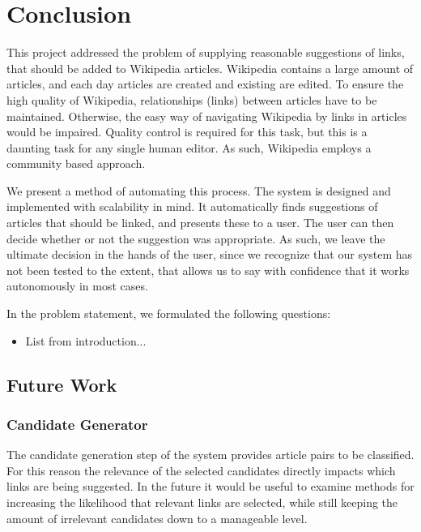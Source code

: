 \chapter{Conclusion}\label{chap:conclusion}
This project addressed the problem of supplying reasonable suggestions of links, that should be added to Wikipedia articles. Wikipedia contains a large amount of articles, and each day articles are created and existing are edited. To ensure the high quality of Wikipedia, relationships (links) between articles have to be maintained. Otherwise, the easy way of navigating Wikipedia by links in articles would be impaired. Quality control is required for this task, but this is a daunting task for any single human editor. As such, Wikipedia employs a community based approach. 

We present a method of automating this process. The system is designed and implemented with scalability in mind. It automatically finds suggestions of articles that should be linked, and presents these to a user. The user can then decide whether or not the suggestion was appropriate. As such, we leave the ultimate decision in the hands of the user, since we recognize that our system has not been tested to the extent, that allows us to say with confidence that it works autonomously in most cases.

In the problem statement, we formulated the following questions:
\begin{itemize}
	\item List from introduction...
\end{itemize}


\section{Future Work}

\subsection{Candidate Generator}
The candidate generation step of the system provides article pairs to be classified. For this reason the relevance of the selected candidates directly impacts which links are being suggested. In the future it would be useful to examine methods for increasing the likelihood that relevant links are selected, while still keeping the amount of irrelevant candidates down to a manageable level.

